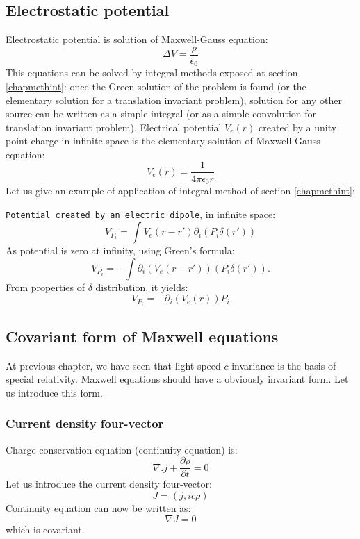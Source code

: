 \documentclass[12pt]{book}
\begin{document}
\subsection{Electrostatic potential}\label{secpotelec}
Electrostatic potential is solution of Maxwell-Gauss equation:
\begin{equation}
\Delta V=\frac{\rho}{\epsilon_0}
\end{equation}
This equations can be solved by integral methods exposed at section
\ref{chapmethint}: once the Green solution of the problem is found (or the
elementary solution for a translation invariant problem), solution for any
other source can be written as a simple integral (or as a simple convolution
for translation invariant problem). Electrical
potential $V_e(r)$ created by a unity point charge in infinite space is the
elementary solution of Maxwell-Gauss equation:
\begin{equation}
V_e(r)=\frac{1}{4\pi\epsilon_0 r}
\end{equation}
Let us give an example of application of integral method of section
\ref{chapmethint}: 
\begin{exmp}
{\tt Potential created by an electric dipole}, in infinite space:
\begin{equation}
V_{P_i}=\int V_e(r-r')\partial_i(P_i\delta(r'))
\end{equation}
As potential is zero at infinity, using Green's formula:
\begin{equation}
V_{P_i}=-\int \partial_i(V_e(r-r'))(P_i\delta(r')).
\end{equation}
From properties of $\delta$ distribution, it yields:
\begin{equation}\label{eqpotdipo}
V_{P_i}=-\partial_i(V_e(r))P_i
\end{equation}
\end{exmp}

\subsection{Covariant form of Maxwell equations}\label{seceqmaxcov}
At previous chapter, we have seen that light speed $c$ invariance is the basis
of special relativity. Maxwell equations should have a obviously invariant
form. Let us introduce this form.
\subsubsection{Current density four-vector}
Charge conservation equation (continuity equation) is:
\begin{equation}
\nabla.j+\frac{\partial \rho}{\partial t}=0
\end{equation}
Let us introduce the current density four-vector:
\begin{equation}
J=(j,ic\rho)
\end{equation}
Continuity equation can now be written as:
\begin{equation}
\nabla J=0
\end{equation}
which is covariant.
\end{document}

